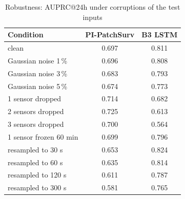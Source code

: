 \begin{table}[t]
\caption{Robustness: AUPRC@24h under corruptions of the test inputs}\label{tab:robust}
\scriptsize
\begin{tabular*}{\columnwidth}{@{\extracolsep\fill}lcc}
\toprule
Condition & PI-PatchSurv & B3 LSTM \\
\midrule
clean & 0.697 & 0.811 \\
Gaussian noise 1\,\% & 0.696 & 0.808 \\
Gaussian noise 3\,\% & 0.683 & 0.793 \\
Gaussian noise 5\,\% & 0.674 & 0.773 \\
1 sensor dropped & 0.714 & 0.682 \\
2 sensors dropped & 0.725 & 0.613 \\
3 sensors dropped & 0.700 & 0.564 \\
1 sensor frozen 60 min & 0.699 & 0.796 \\
resampled to 30 s & 0.653 & 0.824 \\
resampled to 60 s & 0.635 & 0.814 \\
resampled to 120 s & 0.611 & 0.787 \\
resampled to 300 s & 0.581 & 0.765 \\
\bottomrule
\end{tabular*}
\end{table}
